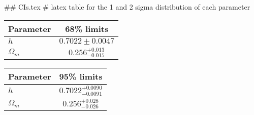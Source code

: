 ## CIs.tex
# latex table for the 1 and 2 sigma distribution of each parameter

\begin{tabular} { l  c}
 Parameter &  68\% limits\\
\hline
{\boldmath$h              $} & $0.7022\pm 0.0047          $\\
{\boldmath$\Omega_m       $} & $0.256^{+0.013}_{-0.015}   $\\
\hline
\end{tabular}

\begin{tabular} { l  c}
 Parameter &  95\% limits\\
\hline
{\boldmath$h              $} & $0.7022^{+0.0090}_{-0.0091}$\\
{\boldmath$\Omega_m       $} & $0.256^{+0.028}_{-0.026}   $\\
\hline
\end{tabular}

